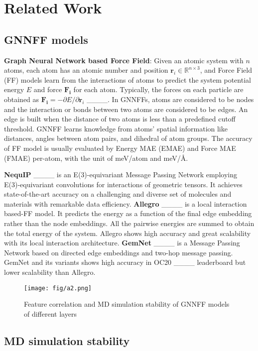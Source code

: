 \section{Related Work}
\subsection{GNNFF models}
\textbf{Graph Neural Network based Force Field}: Given an atomic system with $n$ atoms, each atom has an atomic number and position $ \bm r_i\in\mathbb{R}^{n \times 3}$, and Force Field (FF) models learn from the interactions of atoms to predict the system potential energy $E$ and force $ \bm {F_i}$ for each atom. Typically, the forces on each particle are obtained as $  \bm {F_i} = -\partial E / \partial  \bm {r}_i $ ____. In GNNFFs, atoms are considered to be nodes and the interaction or bonds between two atoms are considered to be edges. An edge is built when the distance of two atoms is less than a predefined cutoff threshold. GNNFF learns knowledge from atoms' spatial information like distances, angles between atom pairs, and dihedral of atom groups. The accuracy of FF model is usually evaluated by Energy MAE (EMAE) and Force MAE (FMAE) per-atom, with the unit of meV/atom and meV/Å.

\textbf{NequIP} ____ is an E(3)-equivariant Message Passing Network employing E(3)-equivariant convolutions for interactions of geometric tensors. It achieves state-of-the-art accuracy on a challenging and diverse set of molecules and materials with remarkable data efficiency.
\textbf{Allegro} ____ is a local interaction based-FF model. It predicts the energy as a function of the final edge embedding rather than the node embeddings. All the pairwise energies are summed to obtain the total energy of the system. Allegro shows high accuracy and great scalability with its local interaction architecture.
\textbf{GemNet} ____ is a Message Passing Network based on directed edge embeddings and two-hop message passing. GemNet and its variants shows high accuracy in OC20 ____ leaderboard but lower scalability than Allegro.  


\begin{figure}[t]
  \centering
  \texttt{[image: fig/a2.png]}
  \caption{Feature correlation and MD simulation stability of GNNFF models of different layers}
  \label{fig_corr}
  \vspace*{-1.0\baselineskip}
\end{figure}


\subsection{MD simulation stability}

